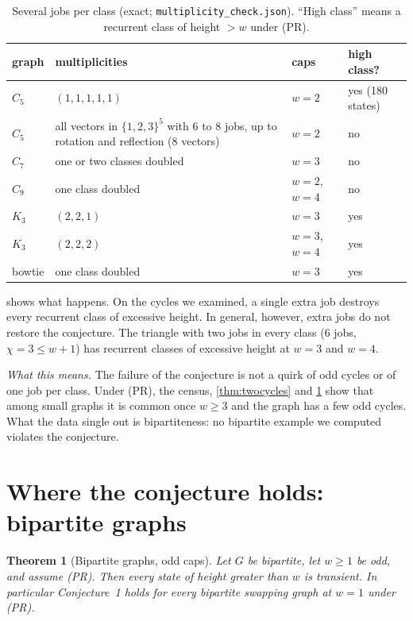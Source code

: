 \documentclass[11pt,a4paper]{article}
\newtheorem{theorem}{Theorem}[section]
\theoremstyle{plain}
\theoremstyle{plain}
\newcommand{\what}[1]{\par\smallskip\noindent\textit{What this means.} #1\par\smallskip}
\begin{document}
\begin{table}[t]
\centering\small
\caption{Several jobs per class (exact; \texttt{multiplicity\_check.json}). ``High class'' means a recurrent class of height $>w$ under (PR).}
\label{tab:mult}
\begin{tabular}{l>{\raggedright\arraybackslash}p{6.2cm}ll}
\toprule
graph & multiplicities & caps & high class?\\
\midrule
$C_5$ & $(1,1,1,1,1)$ & $w=2$ & yes (180 states)\\
$C_5$ & all vectors in $\{1,2,3\}^5$ with $6$ to $8$ jobs, up to rotation and reflection ($8$ vectors) & $w=2$ & no\\
$C_7$ & one or two classes doubled & $w=3$ & no\\
$C_9$ & one class doubled & $w=2$, $w=4$ & no\\
$K_3$ & $(2,2,1)$ & $w=3$ & yes\\
$K_3$ & $(2,2,2)$ & $w=3$, $w=4$ & yes\\
bowtie & one class doubled & $w=3$ & yes\\
\bottomrule
\end{tabular}
\end{table}

 shows what happens. On the cycles we examined, a single extra job destroys every recurrent class of excessive height. In general, however, extra jobs do not restore the conjecture. The triangle with two jobs in every class ($6$ jobs, $\chi=3\le w+1$) has recurrent classes of excessive height at $w=3$ and $w=4$.

\what{The failure of the conjecture is not a quirk of odd cycles or of one job per class. Under (PR), the census, \cref{thm:twocycles} and \cref{tab:mult} show that among small graphs it is common once $w\ge3$ and the graph has a few odd cycles. What the data single out is bipartiteness: no bipartite example we computed violates the conjecture.}

\section{Where the conjecture holds: bipartite graphs}\label{sec:bipartite}

\begin{theorem}[Bipartite graphs, odd caps]\label{thm:bipartite}
Let $G$ be bipartite, let $w\ge1$ be odd, and assume (PR). Then every state of height greater than $w$ is transient. In particular Conjecture~1 holds for every bipartite swapping graph at $w=1$ under (PR).
\end{theorem}
\end{document}
